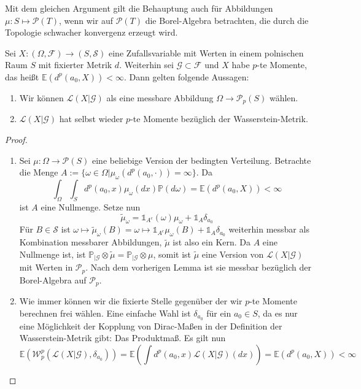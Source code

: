 \begin{remark}\label{rem:kernel_char_no_p}
Mit dem gleichen Argument gilt die Behauptung auch für Abbildungen $\mu: S \mapsto \mathcal{P}(T)$, wenn wir auf $\mathcal{P}(T)$ die Borel-Algebra betrachten, die durch die Topologie schwacher konvergenz erzeugt wird.
\end{remark}
\begin{corollary}\label{thm:pmoments}
    Sei $X:(\Omega, \mathcal{F})\rightarrow(S, \mathcal{S})$ eine Zufallsvariable mit Werten in einem polnischen Raum $S$ mit fixierter Metrik $d$. Weiterhin sei $\mathcal{G}\subset \mathcal{F}$ und $X$ habe $p$-te Momente, das heißt $\mathbb{E}(d^p(a_0, X))<\infty$. Dann gelten folgende Aussagen:
    \begin{enumerate}
        \item Wir können $\mathcal{L}(X\vert \mathcal{G})$ als eine messbare Abbildung $\Omega\rightarrow\mathcal{P}_p(S)$ wählen.
        \item $\mathcal{L}(X\vert \mathcal{G})$ hat selbst wieder $p$-te Momente bezüglich der Wasserstein-Metrik.
    \end{enumerate}
\end{corollary}
\begin{proof}
\begin{enumerate}
    \item Sei $\mu:\Omega\rightarrow\mathcal{P}(S)$ eine beliebige Version der bedingten Verteilung. Betrachte die Menge $A:=\{\omega\in\Omega\vert \mu_\omega(d^p(a_0, \cdot)) = \infty\}$. Da 
$$\int_{\Omega}\int_{S} d^p(a_0, x)\mu_{\omega}(dx)\mathbb{P}(d\omega) = \mathbb{E}(d^p(a_0, X))<\infty$$
ist $A$ eine Nullmenge. Setze nun 
$$\tilde{\mu}_\omega=\mathds{1}_{A^c}(\omega)\mu_\omega + \mathds{1}_{A}\delta_{a_0}$$
Für $B\in\mathcal{S}$ ist $\omega\mapsto\tilde{\mu}_\omega(B) = \omega \mapsto \mathds{1}_{A^c}\mu_\omega(B)+\mathds{1}_A \delta_{a_0}$ weiterhin messbar als Kombination messbarer Abbildungen, $\tilde{\mu}$ ist also ein Kern. Da $A$ eine Nullmenge ist, ist $\mathbb{P}_{\vert \mathcal{G}}\otimes \tilde{\mu} = \mathbb{P}_{\vert\mathcal{G}} \otimes \mu$, somit ist $\tilde{\mu}$ eine Version von $\mathcal{L}(X\vert \mathcal{G})$ mit Werten in $\mathcal{P}_p$. Nach dem vorherigen Lemma ist sie messbar bezüglich der Borel-Algebra auf $\mathcal{P}_p$.
\item Wie immer können wir die fixierte Stelle gegenüber der wir $p$-te Momente berechnen frei wählen. Eine einfache Wahl ist $\delta_{a_0}$ für ein $a_0\in S$, da es nur eine Möglichkeit der Kopplung von Dirac-Maßen in der Definition der Wasserstein-Metrik gibt: Das Produktmaß. Es gilt nun
$$\mathbb{E}\left(\mathcal{W}_p^p\left(\mathcal{L}(X\vert\mathcal{G}), \delta_{a_0}\right)\right)=\mathbb{E}\left(\int d^p(a_0, x)\mathcal{L}(X\vert\mathcal{G})(dx)\right)=\mathbb{E}\left(d^p(a_0, X)\right) < \infty$$
\end{enumerate}
\end{proof}
